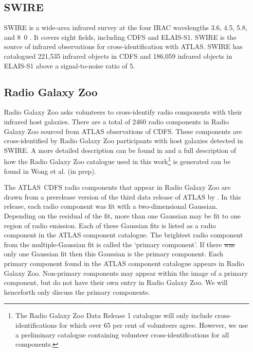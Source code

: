 \documentclass[11pt, a4paper]{book}
\providecommand{\DIFaddtex}[1]{{\protect\color{blue}\uwave{#1}}} %
\providecommand{\DIFdeltex}[1]{{\protect\color{red}\sout{#1}}}                      %
\providecommand{\DIFaddbegin}{} %
\providecommand{\DIFaddend}{} %
\providecommand{\DIFdelbegin}{} %
\providecommand{\DIFdelend}{} %
\providecommand{\DIFadd}[1]{\texorpdfstring{\DIFaddtex{#1}}{#1}} %
\providecommand{\DIFdel}[1]{\texorpdfstring{\DIFdeltex{#1}}{}} %
\newcommand{\DIFscaledelfig}{0.5}
\newlength{\DIFdelgraphicswidth} %
\newlength{\DIFdelgraphicsheight} %
\newcommand{\DIFaddincludegraphics}[2][]{{\color{blue}\fbox{\DIFOincludegraphics[#1]{#2}}}} %
\newcommand{\DIFdelincludegraphics}[2][]{%
\sbox{\DIFdelgraphicsbox}{\DIFOincludegraphics[#1]{#2}}%
\settoboxwidth{\DIFdelgraphicswidth}{\DIFdelgraphicsbox} %
\settoboxtotalheight{\DIFdelgraphicsheight}{\DIFdelgraphicsbox} %
\scalebox{\DIFscaledelfig}{%
\parbox[b]{\DIFdelgraphicswidth}{\usebox{\DIFdelgraphicsbox}\\[-\baselineskip] \rule{\DIFdelgraphicswidth}{0em}}\llap{\resizebox{\DIFdelgraphicswidth}{\DIFdelgraphicsheight}{%
\setlength{\unitlength}{\DIFdelgraphicswidth}%
\begin{picture}(1,1)%
\thicklines\linethickness{2pt} %
{\color[rgb]{1,0,0}\put(0,0){\framebox(1,1){}}}%
{\color[rgb]{1,0,0}\put(0,0){\line( 1,1){1}}}%
{\color[rgb]{1,0,0}\put(0,1){\line(1,-1){1}}}%
\end{picture}%
}\hspace*{3pt}}} %
} %
\DeclareRobustCommand{\DIFaddbegin}{\DIFOaddbegin \let\includegraphics\DIFaddincludegraphics} %
\DeclareRobustCommand{\DIFaddend}{\DIFOaddend \let\includegraphics\DIFOincludegraphics} %
\DeclareRobustCommand{\DIFdelbegin}{\DIFOdelbegin \let\includegraphics\DIFdelincludegraphics} %
\DeclareRobustCommand{\DIFdelend}{\DIFOaddend \let\includegraphics\DIFOincludegraphics} %
\begin{document}
  \subsection{SWIRE}\label{sec:atlas-xid-swire}

    SWIRE is a wide-area infrared
    survey at the four IRAC wavelengths 3.6, 4.5, 5.8, and
    \unit{8.0}{\micro\meter} \citep{lonsdale03swire, surace05swire}. It covers eight fields, including CDFS and ELAIS-S1. SWIRE is the source of infrared
    observations for cross-identification with ATLAS. SWIRE has catalogued 221,535
    infrared objects in CDFS and 186,059 infrared objects in ELAIS-S1 above a signal-to-noise ratio of 5.

  \subsection{Radio Galaxy Zoo}\label{sec:atlas-xid-rgz}

    Radio Galaxy Zoo asks volunteers to cross-identify radio components with
    their infrared host galaxies. There are a total of 2460 radio components
    in Radio Galaxy Zoo sourced from ATLAS {observations of CDFS}. These components are
    cross-identified by Radio Galaxy Zoo participants with host galaxies
    detected in SWIRE. A more detailed description can be found in
    \citet{banfield15} and a full description of how the Radio Galaxy Zoo catalogue used in this work\footnote{The Radio Galaxy Zoo Data
    Release 1 catalogue will only include cross-identifications for which over
    65 per cent of volunteers agree. However, we use a preliminary catalogue containing volunteer
    cross-identifications for all components.} is generated can be found in Wong
    et al. (in prep\DIFaddbegin \DIFadd{.}\DIFaddend ).

    The ATLAS~CDFS radio components that appear in Radio Galaxy Zoo {are drawn from a prerelease version of} the third data release
    of ATLAS by \citet{franzen15}. In this release, each radio component was fit with a
    two-dimensional Gaussian. Depending on the residual of the fit, more than
    one Gaussian may be fit to one region of radio emission. Each of these
    Gaussian fits is listed as a radio component in the ATLAS component catalogue. The
    brightest radio component from the multiple-Gaussian fit is called the
    `primary component'. {If there \DIFdelbegin \DIFdel{was }\DIFdelend \DIFaddbegin \DIFadd{is }\DIFaddend only one Gaussian fit then this Gaussian is the primary component}. Each primary component found in the ATLAS
    component catalogue appears in Radio Galaxy Zoo. Non-primary components
    may appear within the image of a primary component, but do not have their
    own entry in Radio Galaxy Zoo. We will henceforth only discuss the primary
    components.
\end{document}
